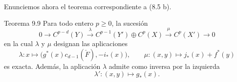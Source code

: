 Enunciemos ahora el teorema correspondiente a (8.5 b).

\begin{statement}{Teorema 9.9}
Para todo entero $p\ge0$, la sucesión
\[
0\to C^{p-d}(Y)\xrightarrow{\lambda} C^{p-1}(Y')\oplus C^p(X)\xrightarrow{\mu} C^p(X')\to0
\]
en la cual $\lambda$ y $\mu$ designan las aplicaciones
\[
\lambda:x\mapsto\bigl(g^*(x)c_{d-1}(\check F),-i_*(x)\bigr),
\qquad
\mu:(x,y)\mapsto j_*(x)+f^*(y)
\]
es exacta. Además, la aplicación $\lambda$ admite como inversa por la izquierda
\[
\lambda':(x,y)\mapsto g_*(x).
\]
\end{statement}

